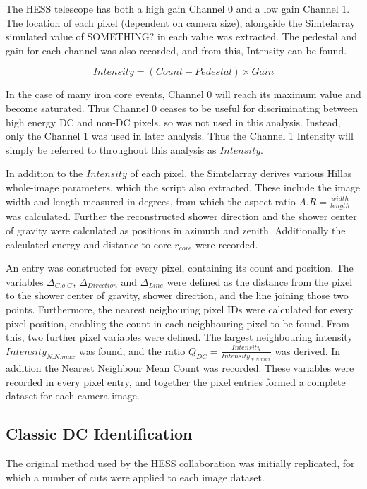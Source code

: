 \documentclass{article}
\begin{document}
The HESS telescope has both a high gain Channel 0 and a low gain Channel 1. The location of each pixel (dependent on camera size), alongside the Sim\textunderscore telarray simulated value of SOMETHING? in each value was extracted. The pedestal and gain for each channel was also recorded, and from this, Intensity can be found.

\[ Intensity = (Count - Pedestal)\times Gain \]

In the case of many iron core events, Channel 0 will reach its maximum value and become saturated. Thus Channel 0 ceases to be useful for discriminating between high energy DC and non-DC pixels, so was not used in this analysis. Instead, only the Channel 1 was used in later analysis. Thus the Channel 1 Intensity will simply be referred to throughout this analysis as $Intensity$. 

In addition to the $Intensity$ of each pixel, the Sim\textunderscore telarray derives various Hillas whole-image parameters, which the script also extracted. These include the image width and length measured in degrees, from which the aspect ratio $A.R = \frac{width}{length}$ was calculated. Further the reconstructed shower direction and the shower center of gravity were calculated as positions in azimuth and zenith. Additionally the calculated energy and distance to core $r_{core}$ were recorded.

An entry was constructed for every pixel, containing its count and position. The variables $ \Delta_{C.o.G}$, $\Delta_{Direction}$ and $\Delta_{Line}$ were defined as the distance from the pixel to the shower center of gravity, shower direction, and the line joining those two points. Furthermore, the nearest neigbouring pixel IDs were calculated for every pixel position, enabling the count in each neighbouring pixel to be found. From this, two further pixel variables were defined. The largest neighbouring intensity $Intensity_{N.N.max}$ was found, and the ratio $ Q_{DC} = \frac{Intensity}{Intensity_{N.N.max}} $ was derived. In addition the Nearest Neighbour Mean Count was recorded. These variables were recorded in every pixel entry, and together the pixel entries formed a complete dataset for each camera image.

\subsection{Classic DC Identification}
The original method used by the HESS collaboration \cite{hess07} was initially replicated, for which a number of cuts were applied to each image dataset.
\end{document}
